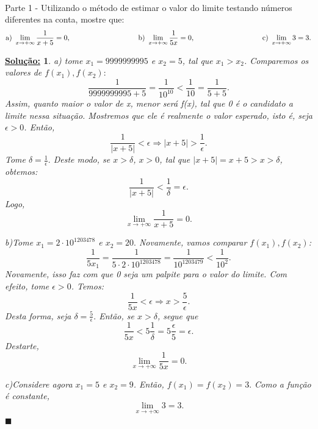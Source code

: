 \documentclass{article}
\newtheorem*{sol*}{\underline{Solu\c c\~ao:}}
\renewcommand\qedsymbol{$\blacksquare$}
\begin{document}
\paragraph{}Parte 1 - Utilizando o m\'etodo de estimar o valor do limite testando n\'umeros diferentes na conta, mostre que:
$$
\text{a) }\lim_{x\to+\infty}\frac{1}{x + 5} = 0,\hspace{3.3cm}
\text{b) }\lim_{x\to+\infty}\frac{1}{5x} = 0,\hspace{3.3cm}
\text{c) }\lim_{x\to+\infty}3 = 3.
$$
\begin{sol*}
a) tome $x_1 = 9999999995$ e $x_2 = 5$, tal que $x_1 > x_2$. Comparemos os valores de $f(x_1), f(x_2):$
$$
\frac{1}{9999999995 + 5} =\frac{1}{10^10} < \frac{1}{10} = \frac{1}{5 + 5}.
$$
Assim, quanto maior o valor de x, menor ser\'a f(x), tal que 0 \'e o candidato a limite nessa situa\c c\~ao. Mostremos que ele \'e realmente o valor esperado, isto \'e, seja $\epsilon > 0$. Ent\~ao, 
$$
\frac{1}{|x + 5|} < \epsilon \Rightarrow |x + 5| > \frac{1}{\epsilon}.
$$
Tome $\delta = \frac{1}{\epsilon}.$ Deste modo, se $x > \delta$, $x > 0$, tal que $|x + 5| = x + 5 > x > \delta$, obtemos:
$$
\frac{1}{|x + 5|} < \frac{1}{\delta} = \epsilon.
$$
Logo, 
$$
\lim_{x\to+\infty}\frac{1}{x + 5} = 0.
$$

b)Tome $x_1 = 2\cdot{10^{1203478}}$ e $x_2 = 20.$ Novamente, vamos comparar $f(x_1), f(x_2)$:
$$
\frac{1}{5x_1} = \frac{1}{5\cdot2\cdot{10^{1203478}}} = \frac{1}{10^{1203479}} < \frac{1}{10^2}.
$$
Novamente, isso faz com que 0 seja um palpite para o valor do limite. Com efeito, tome $\epsilon > 0$. Temos:
$$
\frac{1}{5x} < \epsilon \Rightarrow x > \frac{5}{\epsilon}.
$$
Desta forma, seja $\delta = \frac{5}{\epsilon}.$ Ent\~ao, se $x > \delta$, segue que 
$$
\frac{1}{5x} < 5\frac{1}{\delta} = 5\frac{\epsilon}{5} = \epsilon.
$$
Destarte, 
$$
\lim_{x\to+\infty}\frac{1}{5x} = 0.
$$

c)Considere agora $x_1 = 5$ e $x_2 = 9$. Ent\~ao, $f(x_1) = f(x_2) = 3.$ Como a fun\c c\~ao \'e constante, 
$$
\lim_{x\to+\infty}3 = 3.
$$
\qedsymbol
\end{sol*}
\end{document}
